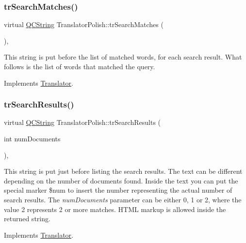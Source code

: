 \subsubsection{\texorpdfstring{trSearchMatches()}{trSearchMatches()}}
{\footnotesize\ttfamily virtual \mbox{\hyperlink{class_q_c_string}{Q\+C\+String}} Translator\+Polish\+::tr\+Search\+Matches (\begin{DoxyParamCaption}{ }\end{DoxyParamCaption})\hspace{0.3cm}{\ttfamily [inline]}, {\ttfamily [virtual]}}

This string is put before the list of matched words, for each search result. What follows is the list of words that matched the query. 

Implements \mbox{\hyperlink{class_translator}{Translator}}.

\mbox{\label{class_translator_polish_a50377b9dde8bdb7e761f6aefa74aeab3}} 
\subsubsection{\texorpdfstring{trSearchResults()}{trSearchResults()}}
{\footnotesize\ttfamily virtual \mbox{\hyperlink{class_q_c_string}{Q\+C\+String}} Translator\+Polish\+::tr\+Search\+Results (\begin{DoxyParamCaption}\item[{int}]{num\+Documents }\end{DoxyParamCaption})\hspace{0.3cm}{\ttfamily [inline]}, {\ttfamily [virtual]}}

This string is put just before listing the search results. The text can be different depending on the number of documents found. Inside the text you can put the special marker \$num to insert the number representing the actual number of search results. The {\itshape num\+Documents} parameter can be either 0, 1 or 2, where the value 2 represents 2 or more matches. H\+T\+ML markup is allowed inside the returned string. 

Implements \mbox{\hyperlink{class_translator}{Translator}}.

\mbox{\label{class_translator_polish_a1e5f630f5e2718f59c4dca3035e6c0e3}} 
